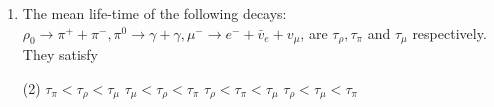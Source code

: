 \begin{enumerate}
$$$$
The cross-section of the above process depends on the centre of mass energy $E$, as
 \begin{tasks}(4)
	\task[\textbf{a.}]$\frac{1}{E^{2}}$
	\task[\textbf{b.}]$E^{2}$
	\task[\textbf{c.}]$E$
	\task[\textbf{d.}]$\sqrt{E}$ 
\end{tasks}
\item  The mean life-time of the following decays:\\
$\rho_{0} \rightarrow \pi^{+}+\pi^{-}, \pi^{0} \rightarrow \gamma+\gamma, \mu^{-} \rightarrow e^{-}+\bar{v}_{e}+v_{\mu}$, are $\tau_{\rho}, \tau_{\pi}$ and $\tau_{\mu}$ respectively.
They satisfy
 \begin{tasks}(2)
	\task[\textbf{a.}]$\tau_{\pi}<\tau_{\rho}<\tau_{\mu}$
	\task[\textbf{b.}]$\tau_{\mu}<\tau_{\rho}<\tau_{\pi}$
	\task[\textbf{c.}]$\tau_{\rho}<\tau_{\pi}<\tau_{\mu}$
	\task[\textbf{d.}]$\tau_{\rho}<\tau_{\mu}<\tau_{\pi}$ 
\end{tasks}
\end{enumerate}